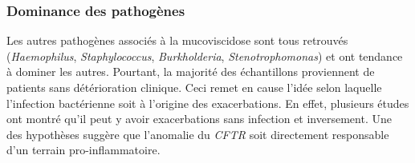 \documentclass[12pt,a4paper]{article}
\begin{document}
\subsubsection{Dominance des pathogènes}
Les autres pathogènes associés à la mucoviscidose sont tous retrouvés (\textit{Haemophilus}, \textit{Staphylococcus}, \textit{Burkholderia}, \textit{Stenotrophomonas}) et ont tendance à dominer les autres. Pourtant, la majorité des échantillons proviennent de patients sans détérioration clinique. Ceci remet en cause l'idée selon laquelle l'infection bactérienne soit à l'origine des exacerbations. En effet, plusieurs études \cite{Tirouvanziam2000,Heijerman2005} ont montré qu'il peut y avoir exacerbations sans infection et inversement. Une des hypothèses suggère que l'anomalie du \textit{CFTR} soit directement responsable d'un terrain pro-inflammatoire.
\end{document}
